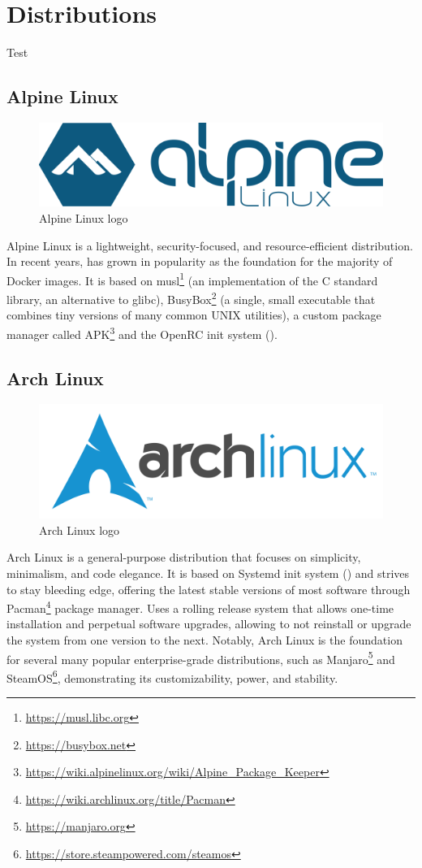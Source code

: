 \chapter{Distributions}
\label{cha:distributions}

Test

\section{Alpine Linux}
\label{sec:distributions_alpine_linux}

\begin{figure}
  \centering
  \includegraphics[width=.23\textwidth]{images/logos/alpine.png}
  \caption{Alpine Linux logo}
\end{figure}

Alpine Linux is a lightweight, security-focused, and resource-efficient
distribution. In recent years, has grown in popularity as the foundation for the
majority of Docker images. It is based on musl\footnote{\url{https://musl.libc.org}}
(an implementation of the C standard library, an alternative to glibc), BusyBox\footnote{\url{https://busybox.net}}
(a single, small executable that combines tiny versions of many common UNIX utilities),
a custom package manager called APK\footnote{\url{https://wiki.alpinelinux.org/wiki/Alpine_Package_Keeper}}
and the OpenRC init system ()\cite{alpine_linux}. %

\section{Arch Linux}
\label{sec:distributions_arch_linux}

\begin{figure}
  \centering
  \includegraphics[width=.23\textwidth]{images/logos/arch.png}
  \caption{Arch Linux logo}
\end{figure}

Arch Linux is a general-purpose distribution that focuses on simplicity, minimalism,
and code elegance. It is based on Systemd init system () %
and strives to stay bleeding edge, offering the latest stable versions of most
software through Pacman\footnote{\url{https://wiki.archlinux.org/title/Pacman}}
package manager. Uses a rolling release system that allows one-time installation
and perpetual software upgrades, allowing to not reinstall or upgrade the system
from one version to the next. Notably, Arch Linux is the foundation for several
many popular enterprise-grade distributions, such as Manjaro\footnote{\url{https://manjaro.org}}
and SteamOS\footnote{\url{https://store.steampowered.com/steamos}},
demonstrating its customizability, power, and stability\cite{arch_linux}.